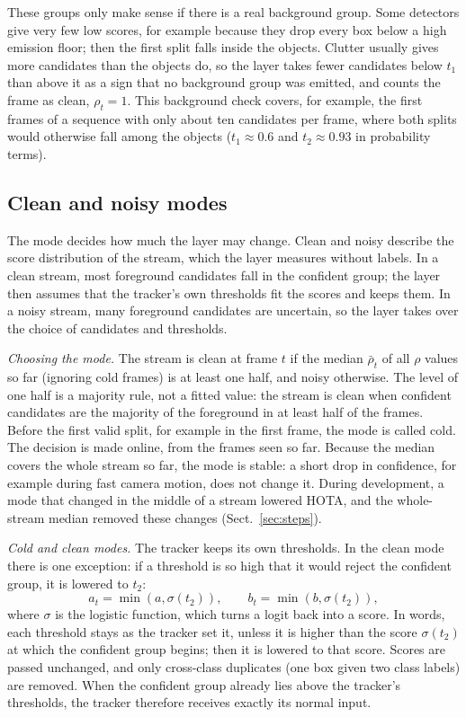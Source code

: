These groups only make sense if there is a real background group. Some
detectors give very few low scores, for example because they drop every box
below a high emission floor; then the first split falls inside the objects.
Clutter usually gives more candidates than the objects do, so the layer takes
fewer candidates below $t_1$ than above it as a sign that no background group
was emitted, and counts the frame as clean, $\rho_t=1$. This background
check covers, for example, the first frames of a sequence with only about
ten candidates per frame, where both splits would otherwise fall among the
objects ($t_1\approx0.6$ and $t_2\approx0.93$ in probability terms).

\subsection{Clean and noisy modes}\label{sec:regimes}
The mode decides how much the layer may change. Clean and noisy describe the
score distribution of the stream, which the layer measures without labels. In a
clean stream, most foreground candidates fall in the confident group; the
layer then assumes that the tracker's own thresholds fit the scores and keeps
them. In a noisy stream, many foreground candidates are uncertain, so the
layer takes over the choice of candidates and thresholds.

\emph{Choosing the mode.} The stream is clean at frame $t$ if the median
$\bar\rho_t$ of all $\rho$ values so far (ignoring cold frames) is at least
one half, and noisy otherwise. The level of one half is a majority rule, not
a fitted value: the stream is clean when confident candidates are the
majority of the foreground in at least half of the frames. Before the first valid split, for
example in the first frame, the mode is called cold. The decision is made
online, from the frames seen so far. Because the median covers the whole
stream so far, the mode is stable: a short drop in confidence, for example
during fast camera motion, does not change it. During development, a mode
that changed in the middle of a stream lowered HOTA, and the whole-stream
median removed these changes (Sect.~\ref{sec:steps}).

\emph{Cold and clean modes.} The tracker keeps its own thresholds. In the
clean mode there is one exception: if a threshold is so high that it would
reject the confident group, it is lowered to $t_2$:
\begin{equation}
a_t=\min\!\left(a,\sigma(t_2)\right),\qquad b_t=\min\!\left(b,\sigma(t_2)\right),
\label{eq:clean}
\end{equation}
where $\sigma$ is the logistic function, which turns a logit back into a
score. In words, each threshold stays as the tracker set it, unless it is
higher than the score $\sigma(t_2)$ at which the confident group begins; then
it is lowered to that score. Scores are passed unchanged, and only cross-class duplicates (one box
given two class labels) are removed. When the confident group already lies
above the tracker's thresholds, the tracker therefore receives exactly its
normal input.

